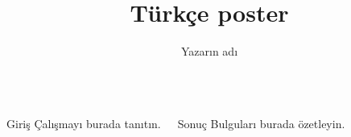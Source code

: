 \documentclass{beamer}
\title{Türkçe poster}
\author{Yazarın adı}
\begin{document}
\begin{frame}
\begin{columns}[t]
  \begin{block}{Giriş}
    Çalışmayı burada tanıtın.
  \end{block}
  \begin{block}{Sonuç}
    Bulguları burada özetleyin.
  \end{block}
\end{columns}
\end{frame}
\end{document}
